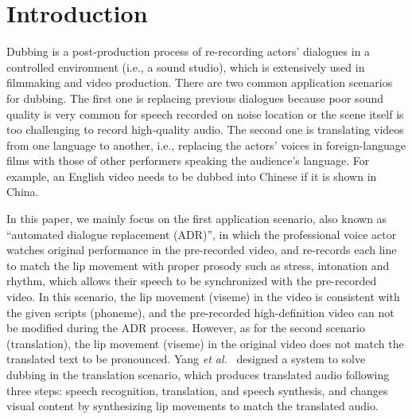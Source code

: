 \documentclass{article}
\begin{document}
\section{Introduction}
\label{sec:intro}
Dubbing is a post-production process of re-recording actors' dialogues in a controlled environment (i.e., a sound studio), which is extensively used in filmmaking and video production. 
There are two common application scenarios for dubbing.
The first one is replacing previous dialogues because poor sound quality is very common for speech recorded on noise location or the scene itself is too challenging to record high-quality audio. 
The second one is translating videos from one language to another, i.e., replacing the actors' voices in foreign-language films with those of other performers speaking the audience's language. For example, an English video needs to be dubbed into Chinese if it is shown in China.

In this paper, we mainly focus on the first application scenario, also known as ``automated dialogue replacement (ADR)'', in which the professional voice actor watches original performance in the pre-recorded video, and re-records each line to match the lip movement with proper prosody such as stress, intonation and rhythm, which allows their speech to be synchronized with the pre-recorded video.
In this scenario, the lip movement (viseme) in the video is consistent with the given scripts (phoneme), and the pre-recorded high-definition video can not be modified during the ADR process. 
However, as for the second scenario (translation), the lip movement (viseme) in the original video does not match the translated text to be pronounced. Yang \textit{et al.}~\cite{yang2020large} designed a system to solve dubbing in the translation scenario, which produces translated audio following three steps: speech recognition, translation, and speech synthesis, and changes visual content by synthesizing lip movements to match the translated audio.

\end{document}
